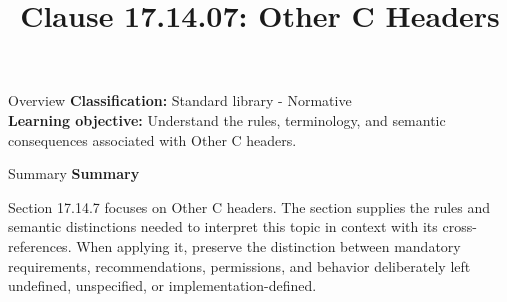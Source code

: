 \documentclass[10pt,letterpaper]{article}
\title{Clause 17.14.07: Other C Headers}
\author{}
\date{}
\begin{document}
\maketitle
\begin{CornellOverviewBox}{Overview}
\textbf{Classification:} Standard library - Normative\\[2pt]
\textbf{Learning objective:} Understand the rules, terminology, and semantic consequences associated with Other C headers.
\end{CornellOverviewBox}\begin{CornellSummaryBox}{Summary}
{\sffamily\bfseries\color{Accent} Summary}\par\vspace{3pt}Section 17.14.7 focuses on Other C headers. The section supplies the rules and semantic distinctions needed to interpret this topic in context with its cross-references. When applying it, preserve the distinction between mandatory requirements, recommendations, permissions, and behavior deliberately left undefined, unspecified, or implementation-defined.
\end{CornellSummaryBox}
\end{document}
